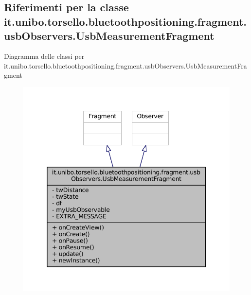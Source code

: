 \hypertarget{classit_1_1unibo_1_1torsello_1_1bluetoothpositioning_1_1fragment_1_1usbObservers_1_1UsbMeasurementFragment}{}\subsection{Riferimenti per la classe it.\+unibo.\+torsello.\+bluetoothpositioning.\+fragment.\+usb\+Observers.\+Usb\+Measurement\+Fragment}
\label{classit_1_1unibo_1_1torsello_1_1bluetoothpositioning_1_1fragment_1_1usbObservers_1_1UsbMeasurementFragment}


Diagramma delle classi per it.\+unibo.\+torsello.\+bluetoothpositioning.\+fragment.\+usb\+Observers.\+Usb\+Measurement\+Fragment
\nopagebreak
\begin{figure}[H]
\begin{center}
\leavevmode
\includegraphics[width=345pt]{classit_1_1unibo_1_1torsello_1_1bluetoothpositioning_1_1fragment_1_1usbObservers_1_1UsbMeasurementFragment__inherit__graph}
\end{center}
\end{figure}


